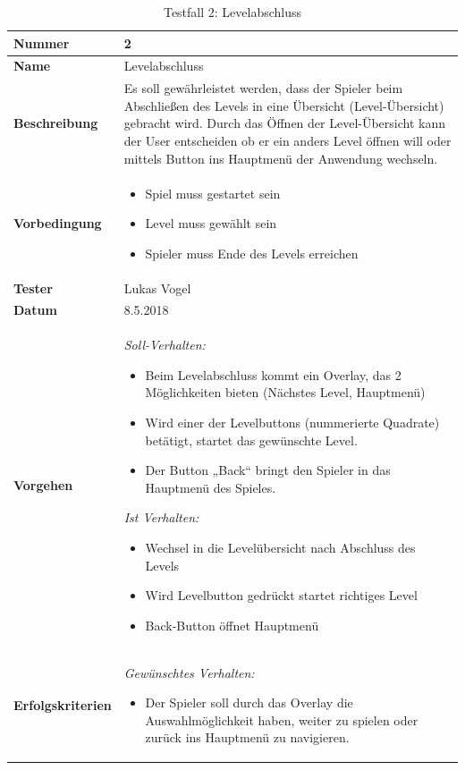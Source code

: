 \begin{table}

	\renewcommand{\arraystretch}{1.5}
	\begin{tabular}{|p{3.5cm}|p{11cm}|}
		
		\hline 
		\textbf{Nummer} & 2 \\ 
		\hline 
		\textbf{Name} & {\large Levelabschluss} \\ 
		\hline 
		\textbf{Beschreibung} & 
		Es soll gewährleistet werden, dass der Spieler beim Abschließen des Levels in eine Übersicht (Level-Übersicht) gebracht wird. Durch das Öffnen der Level-Übersicht kann der User entscheiden ob er ein anders Level öffnen will oder mittels Button ins Hauptmenü der Anwendung wechseln. \\ 
		\hline 
		\textbf{Vorbedingung} & 
		\begin{itemize}
			\setlength{\itemsep}{1pt}
			\setlength{\parskip}{0.5pt}
			\item Spiel muss gestartet sein
			\item Level muss gewählt sein
			\item Spieler muss Ende des Levels erreichen
		\end{itemize} \\ 
		\hline 
		\textbf{Tester} & Lukas Vogel \\ 
		\hline 
		\textbf{Datum} & 8.5.2018 \\ 
		\hline 
		\textbf{Vorgehen} & 
		\textit{Soll-Verhalten:}
		\begin{itemize}
			\setlength{\itemsep}{1pt}
			\setlength{\parskip}{0.5pt}
			\item Beim Levelabschluss kommt ein Overlay, das 2 Möglichkeiten bieten (Nächstes Level, Hauptmenü)
			\item Wird einer der Levelbuttons (nummerierte Quadrate) betätigt, startet das gewünschte Level. 
			\item Der Button „Back“ bringt den Spieler in das Hauptmenü des Spieles. \newline
		\end{itemize}  
		
		
		\textit{Ist Verhalten:}
		\begin{itemize}
			\setlength{\itemsep}{1pt}
			\setlength{\parskip}{0.5pt}
			\item Wechsel in die Levelübersicht nach Abschluss des Levels
			\item Wird Levelbutton gedrückt startet richtiges Level
			\item Back-Button öffnet Hauptmenü 
		\end{itemize}\\ 
		\hline 
		\textbf{Erfolgskriterien} & 
		\textit{Gewünschtes Verhalten:}
		\begin{itemize}
			\setlength{\itemsep}{1pt}
			\setlength{\parskip}{0.5pt}
			\item 	Der Spieler soll durch das Overlay die Auswahlmöglichkeit haben, weiter zu spielen oder zurück ins Hauptmenü zu navigieren.
		\end{itemize} \\ 
		\hline 
	\end{tabular} 
	\caption{Testfall 2: Levelabschluss}
\end{table}
